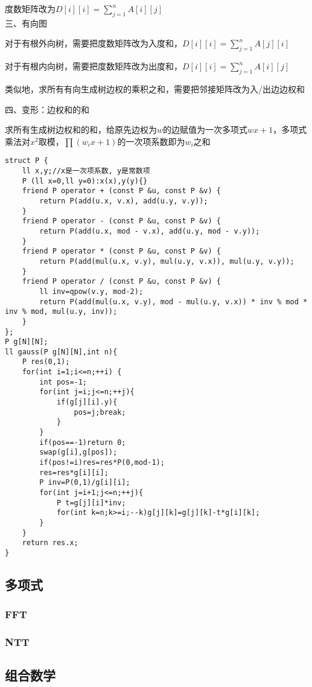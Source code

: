 \documentclass[a4paper]{article}
\begin{document}
度数矩阵改为$D[i][i]=\sum\limits_{j=1}^n A[i][j]$\\

三、有向图

对于有根外向树，需要把度数矩阵改为入度和，$D[i][i]=\sum\limits_{j=1}^nA[j][i]$

对于有根内向树，需要把度数矩阵改为出度和，$D[i][i]=\sum\limits_{j=1}^nA[i][j]$

类似地，求所有有向生成树边权的乘积之和，需要把邻接矩阵改为入/出边边权和

四、变形：边权和的和

求所有生成树边权和的和，给原先边权为$w$的边赋值为一次多项式$wx+1$，多项式乘法对$x^2$取模，$\prod (w_ix+1)$的一次项系数即为$w_i$之和

\begin{lstlisting}
struct P {
	ll x,y;//x是一次项系数, y是常数项
	P (ll x=0,ll y=0):x(x),y(y){}
	friend P operator + (const P &u, const P &v) {
		return P(add(u.x, v.x), add(u.y, v.y));
	}
	friend P operator - (const P &u, const P &v) {
		return P(add(u.x, mod - v.x), add(u.y, mod - v.y));
	}
	friend P operator * (const P &u, const P &v) {
		return P(add(mul(u.x, v.y), mul(u.y, v.x)), mul(u.y, v.y));
	}
	friend P operator / (const P &u, const P &v) {
		ll inv=qpow(v.y, mod-2);
		return P(add(mul(u.x, v.y), mod - mul(u.y, v.x)) * inv % mod * inv % mod, mul(u.y, inv));
	}
};
P g[N][N];
ll gauss(P g[N][N],int n){
	P res(0,1);
	for(int i=1;i<=n;++i) {
		int pos=-1;
		for(int j=i;j<=n;++j){
			if(g[j][i].y){
				pos=j;break;
			}
		}
		if(pos==-1)return 0;
		swap(g[i],g[pos]);
		if(pos!=i)res=res*P(0,mod-1);
		res=res*g[i][i];
		P inv=P(0,1)/g[i][i];
		for(int j=i+1;j<=n;++j){
			P t=g[j][i]*inv;
			for(int k=n;k>=i;--k)g[j][k]=g[j][k]-t*g[i][k];
		}
	}
	return res.x;
}
\end{lstlisting}
\subsection{多项式}
\subsubsection{FFT}

\subsubsection{NTT}

\subsection{组合数学}
\end{document}
